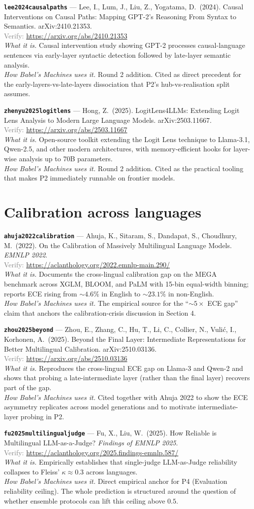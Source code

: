 \documentclass[11pt,a4paper]{article}
\newcommand{\entry}[5]{%
  \par\smallskip
  \noindent\textbf{\texttt{#1}} --- #2\\
  {\footnotesize \textcolor{gray}{Verify:} \url{#3}}\\
  \textit{What it is.} #4\\
  \textit{How Babel's Machines uses it.} #5
  \par\medskip
}
\begin{document}
\entry{lee2024causalpaths}
{Lee, I., Lum, J., Liu, Z., Yogatama, D.\ (2024). Causal Interventions on Causal Paths: Mapping GPT-2's Reasoning From Syntax to Semantics. arXiv:2410.21353.}
{https://arxiv.org/abs/2410.21353}
{Causal intervention study showing GPT-2 processes causal-language sentences via early-layer syntactic detection followed by late-layer semantic analysis.}
{Round 2 addition. Cited as direct precedent for the early-layers-vs-late-layers dissociation that P2's hub-vs-realisation split assumes.}

\entry{zhenyu2025logitlens}
{Hong, Z.\ (2025). LogitLens4LLMs: Extending Logit Lens Analysis to Modern Large Language Models. arXiv:2503.11667.}
{https://arxiv.org/abs/2503.11667}
{Open-source toolkit extending the Logit Lens technique to Llama-3.1, Qwen-2.5, and other modern architectures, with memory-efficient hooks for layer-wise analysis up to 70B parameters.}
{Round 2 addition. Cited as the practical tooling that makes P2 immediately runnable on frontier models.}

\section{Calibration across languages}

\entry{ahuja2022calibration}
{Ahuja, K., Sitaram, S., Dandapat, S., Choudhury, M.\ (2022). On the Calibration of Massively Multilingual Language Models. \emph{EMNLP 2022}.}
{https://aclanthology.org/2022.emnlp-main.290/}
{Documents the cross-lingual calibration gap on the MEGA benchmark across XGLM, BLOOM, and PaLM with 15-bin equal-width binning; reports ECE rising from $\sim 4.6\%$ in English to $\sim 23.1\%$ in non-English.}
{The empirical source for the ``$\sim 5\times$ ECE gap'' claim that anchors the calibration-crisis discussion in Section 4.}

\entry{zhou2025beyond}
{Zhou, E., Zhang, C., Hu, T., Li, C., Collier, N., Vuli\'c, I., Korhonen, A.\ (2025). Beyond the Final Layer: Intermediate Representations for Better Multilingual Calibration. arXiv:2510.03136.}
{https://arxiv.org/abs/2510.03136}
{Reproduces the cross-lingual ECE gap on Llama-3 and Qwen-2 and shows that probing a late-intermediate layer (rather than the final layer) recovers part of the gap.}
{Cited together with Ahuja 2022 to show the ECE asymmetry replicates across model generations and to motivate intermediate-layer probing in P2.}

\entry{fu2025multilingualjudge}
{Fu, X., Liu, W.\ (2025). How Reliable is Multilingual LLM-as-a-Judge? \emph{Findings of EMNLP 2025}.}
{https://aclanthology.org/2025.findings-emnlp.587/}
{Empirically establishes that single-judge LLM-as-Judge reliability collapses to Fleiss' $\kappa \approx 0.3$ across languages.}
{Direct empirical anchor for P4 (Evaluation reliability ceiling). The whole prediction is structured around the question of whether ensemble protocols can lift this ceiling above $0.5$.}
\end{document}
